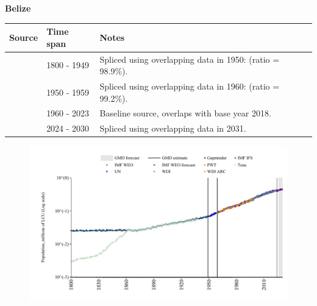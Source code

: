 \documentclass[12pt,a4paper,landscape]{article}
\begin{document}
\begin{adjustbox}{max totalsize={\paperwidth}{\paperheight},center}
\begin{minipage}[t][\textheight][t]{\textwidth}
\vspace*{0.5cm}
{}
\begin{center}
{\Large\bfseries Belize}
\end{center}
\vspace{0.5cm}
\begin{table}[H]
\centering
\small
\begin{tabular}{|l|l|l|}
\hline
\textbf{Source} & \textbf{Time span} & \textbf{Notes} \\
\hline
\rowcolor{white}\cite{Gapminder}& 1800 - 1949 &Spliced using overlapping data in 1950: (ratio = 98.9\%).\\
\rowcolor{lightgray}\cite{IMF_IFS}& 1950 - 1959 &Spliced using overlapping data in 1960: (ratio = 99.2\%).\\
\rowcolor{white}\cite{WDI}& 1960 - 2023 &Baseline source, overlaps with base year 2018.\\
\rowcolor{lightgray}\cite{Gapminder}& 2024 - 2030 &Spliced using overlapping data in 2031.\\
\hline
\end{tabular}
\end{table}
\begin{figure}[H]
\centering
\includegraphics[width=\textwidth,height=0.6\textheight,keepaspectratio]{graphs/BLZ_pop.pdf}
\end{figure}
\end{minipage}
\end{adjustbox}
\end{document}
